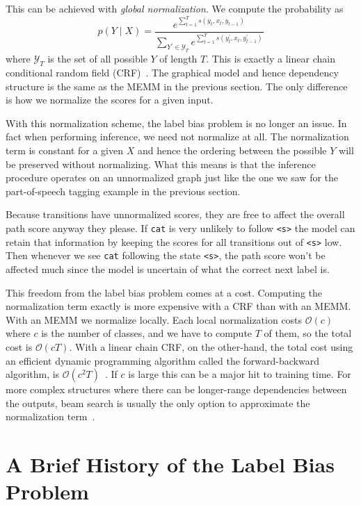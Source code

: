 \documentclass[11pt, letterpaper]{article}
\newcommand{\Y}{\mathcal{Y}}
\begin{document}
This can be achieved with \emph{global normalization}. We compute the probability as
\begin{equation}
p(Y \mid X) = \frac{e^{\sum_{t=1}^T s(y_t, x_t, y_{t-1})}}{
    \sum_{Y^\prime \in \Y_T} e^{\sum_{t=1}^T s(y_t^\prime, x_t, y^\prime_{t-1})}}
\end{equation}
where $\Y_T$ is the set of all possible $Y$ of length $T$.  This is exactly a
linear chain conditional random field (CRF)~\citep{lafferty2001}. The graphical
model and hence dependency structure is the same as the MEMM in the previous
section. The only difference is how we normalize the scores for a given input.

With this normalization scheme, the label bias problem is no longer an issue.
In fact when performing inference, we need not normalize at all. The
normalization term is constant for a given $X$ and hence the ordering between
the possible $Y$ will be preserved without normalizing. What this means is that
the inference procedure operates on an unnormalized graph just like the one we
saw for the part-of-speech tagging example in the previous section.

Because transitions have unnormalized scores, they are free to affect the
overall path score anyway they please. If \texttt{cat} is very unlikely to
follow \texttt{<s>} the model can retain that information by keeping the scores
for all transitions out of \texttt{<s>} low. Then whenever we see \texttt{cat}
following the state \texttt{<s>}, the path score won't be affected much since
the model is uncertain of what the correct next label is.

This freedom from the label bias problem comes at a cost. Computing the
normalization term exactly is more expensive with a CRF than with an MEMM.
With an MEMM we normalize locally. Each local normalization costs
$\mathcal{O}(c)$ where $c$ is the number of classes, and we have to compute $T$
of them, so the total cost is $\mathcal{O}(cT)$. With a linear chain CRF, on
the other-hand, the total cost using an efficient dynamic programming algorithm
called the forward-backward algorithm, is $\mathcal{O}(c^2T)$~\citep{sutton2012}. If
$c$ is large this can be a major hit to training time. For more complex
structures where there can be longer-range dependencies between the outputs,
beam search is usually the only option to approximate the normalization
term~\citep{collobert2019}.

\section{A Brief History of the Label Bias Problem}
\end{document}
